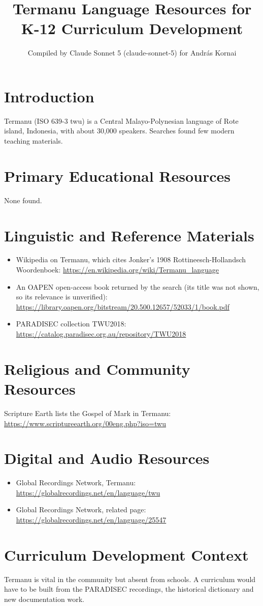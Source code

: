 \documentclass[12pt]{article}
\title{Termanu Language Resources for K-12 Curriculum Development}
\author{Compiled by Claude Sonnet 5 (claude-sonnet-5) for Andr\'as Kornai}
\date{}
\begin{document}
\maketitle
\section{Introduction}
Termanu (ISO 639-3 twu) is a Central Malayo-Polynesian language of Rote island, Indonesia, with about 30,000 speakers. Searches found few modern teaching materials.
\section{Primary Educational Resources}
None found.
\section{Linguistic and Reference Materials}
\begin{itemize}
\item Wikipedia on Termanu, which cites Jonker's 1908 Rottineesch-Hollandsch Woordenboek: \url{https://en.wikipedia.org/wiki/Termanu_language}
\item An OAPEN open-access book returned by the search (its title was not shown, so its relevance is unverified): \url{https://library.oapen.org/bitstream/20.500.12657/52033/1/book.pdf}
\item PARADISEC collection TWU2018: \url{https://catalog.paradisec.org.au/repository/TWU2018}
\end{itemize}
\section{Religious and Community Resources}
Scripture Earth lists the Gospel of Mark in Termanu: \url{https://www.scriptureearth.org/00eng.php?iso=twu}
\section{Digital and Audio Resources}
\begin{itemize}
\item Global Recordings Network, Termanu: \url{https://globalrecordings.net/en/language/twu}
\item Global Recordings Network, related page: \url{https://globalrecordings.net/en/language/25547}
\end{itemize}
\section{Curriculum Development Context}
Termanu is vital in the community but absent from schools. A curriculum would have to be built from the PARADISEC recordings, the historical dictionary and new documentation work.
\end{document}
